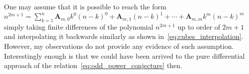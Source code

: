 One may assume that it is possible to reach the form $n^{2m+1} = \sum_{k=1}^{n} \mathbf{A}_{m,0} k^0 (n-k)^0 + \mathbf{A}_{m,1}(n-k)^1
+ \cdots + \mathbf{A}_{m,m} k^m (n-k)^m$ simply taking finite differences of the polynomial $n^{2m+1}$ up to order of $2m+1$ 
and interpolating it backwards similarly as shown in~\eqref{eq:cubes_interpolation}.
However, my observations do not provide any evidence of such assumption.
Interestingly enough is that we could have been arrived to the pure differential approach of the relation~\eqref{eq:odd_power_conjecture} then.